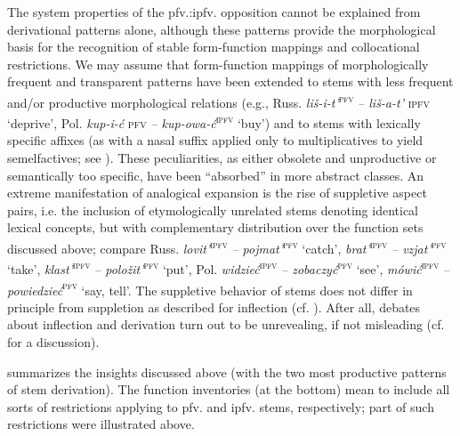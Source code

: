 \documentclass[output=paper]{langscibook}
\begin{document}
The system properties of the pfv.:ipfv. opposition cannot be explained from derivational patterns alone, although these patterns provide the morphological basis for the recognition of stable form-function mappings and collocational restrictions. We may assume that form-function mappings of morphologically frequent and transparent patterns have been extended to stems with less frequent and/or productive morphological relations (e.g., Russ. \textit{liš-i-t’}\textsc{\textsuperscript{pfv}} \textit{– liš-a-t’} \textsc{ipfv} ‘deprive’, Pol. \textit{kup-i-ć} \textsc{pfv} \textit{– kup-owa-ć}\textsc{\textsuperscript{ipfv}} ‘buy’) and to stems with lexically specific affixes (as with a nasal suffix applied only to multiplicatives to yield semelfactives; see ). These peculiarities, as either obsolete and unproductive or semantically too specific, have been “absorbed” in more abstract classes. An extreme manifestation of analogical expansion is the rise of suppletive aspect pairs, i.e. the inclusion of etymologically unrelated stems denoting identical lexical concepts, but with complementary distribution over the function sets discussed above; compare Russ. \textit{lovit’}\textsc{\textsuperscript{ipfv}} \textit{– pojmat’}\textsc{\textsuperscript{pfv}} ‘catch’, \textit{brat’}\textsc{\textsuperscript{ipfv}} \textit{– vzjat’}\textsc{\textsuperscript{pfv}} ‘take’, \textit{klast’}\textsc{\textsuperscript{ipfv}} \textit{– položit’}\textsc{\textsuperscript{pfv}} ‘put’, Pol. \textit{widzieć}\textsc{\textsuperscript{ipfv}} \textit{– zobaczyć}\textsc{\textsuperscript{pfv}} ‘see’, \textit{mówić}\textsc{\textsuperscript{ipfv}} \textit{– powiedzieć}\textsc{\textsuperscript{pfv}} ‘say, tell’. The suppletive behavior of stems does not differ in principle from suppletion as described for inflection (cf. \citealt{Veselinova2006}). After all, debates about inflection and derivation turn out to be unrevealing, if not misleading (cf. \citealt{Wiemer2020b} for a discussion).

 summarizes the insights discussed above (with the two most productive patterns of stem derivation). The function inventories (at the bottom) mean to include all sorts of restrictions applying to pfv. and ipfv. stems, respectively; part of such restrictions were illustrated above.
\end{document}
